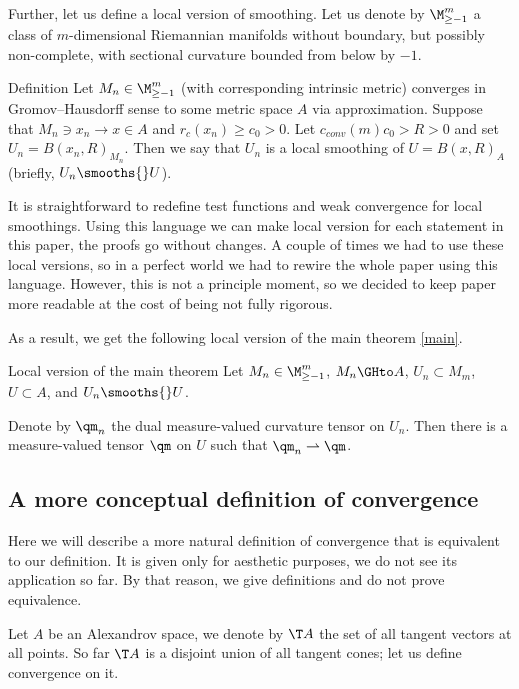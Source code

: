 Further, let us define a local version of smoothing.
Let us denote by
$\M_{\ge -1}^m$ a class of $m$-dimensional Riemannian 
manifolds without boundary, but possibly non-complete, with sectional curvature bounded
from below by $-1$.

\begin{rdef}{Definition}
Let 
$M_n\in\M_{\ge -1}^m$ (with corresponding intrinsic metric)
converges in Gromov--Hausdorff sense to some metric space $A$ via
approximation.
Suppose that $M_n\ni x_n\to x\in A$
and $r_c(x_n)\ge c_0>0$. Let $c_{conv}(m)c_0 > R>0$ and set
$U_n=B(x_n,R)_{M_n}$.
Then we say that $U_n$ is a local smoothing of $U=B(x,R)_A$ (briefly, $U_n\smooths{} U$).
\end{rdef}

It is straightforward to redefine test functions and weak convergence for local smoothings.
Using this language we can make local version for each statement in this paper, the proofs go without changes.
A couple of times we had to use these local versions, so in a perfect world we had to rewire the whole paper using this language.
However, this is not a principle moment,
so we decided to keep paper more readable at the cost of being not fully rigorous. 

As a result, we get the following local version of the main theorem \ref{main}.
 
\begin{thm}{Local version of the main theorem}\label{mainloc}
Let   
$M_n\in\M_{\ge -1}^m$,
$M_n\GHto A$, $U_n\subset M_m$,
  $U\subset A$, and $U_n\smooths{} U$.
  
Denote by $\qm_n$ the dual measure-valued curvature tensor on $U_n$.
Then there is a measure-valued tensor $\qm$ on $U$ such that $\qm_n\rightharpoonup \qm$.
\end{thm}

\subsection{A more conceptual definition of convergence}

Here we will describe a more natural definition of convergence that is equivalent to our definition.
It is given only for aesthetic purposes, we do not see its application so far.
By that reason, we give definitions and do not prove equivalence.

Let $A$ be an Alexandrov space, we denote by $\T A$ the set of all tangent vectors at all points.
So far $\T A$ is a disjoint union of all tangent cones;
let us define convergence on it.

